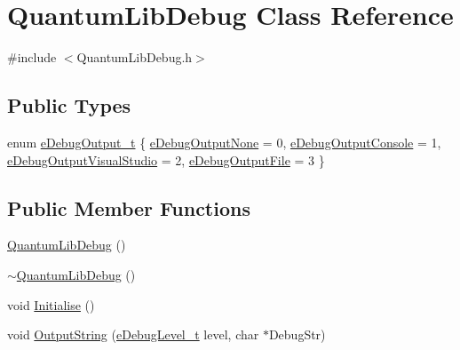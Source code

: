 \hypertarget{class_quantum_lib_debug}{}\section{Quantum\+Lib\+Debug Class Reference}
\label{class_quantum_lib_debug}


{\ttfamily \#include $<$Quantum\+Lib\+Debug.\+h$>$}

\subsection*{Public Types}
\begin{DoxyCompactItemize}
\item 
enum \mbox{\hyperlink{class_quantum_lib_debug_a02246b73828eeaee6859743af47523c7}{e\+Debug\+Output\+\_\+t}} \{ \mbox{\hyperlink{class_quantum_lib_debug_a02246b73828eeaee6859743af47523c7a9d690393603a0b15640bd9fd031d707c}{e\+Debug\+Output\+None}} = 0, 
\mbox{\hyperlink{class_quantum_lib_debug_a02246b73828eeaee6859743af47523c7ae2c700174e804a4cfd9c657ecac337c4}{e\+Debug\+Output\+Console}} = 1, 
\mbox{\hyperlink{class_quantum_lib_debug_a02246b73828eeaee6859743af47523c7ac72ddecd23f70d34ed2445e05b33006a}{e\+Debug\+Output\+Visual\+Studio}} = 2, 
\mbox{\hyperlink{class_quantum_lib_debug_a02246b73828eeaee6859743af47523c7ad2f92e5949ddf18ceba61b355859a64c}{e\+Debug\+Output\+File}} = 3
 \}
\end{DoxyCompactItemize}
\subsection*{Public Member Functions}
\begin{DoxyCompactItemize}
\item 
\mbox{\hyperlink{class_quantum_lib_debug_ae6b98a812d918c08cfc99a6113a3c9db}{Quantum\+Lib\+Debug}} ()
\item 
\mbox{\hyperlink{class_quantum_lib_debug_a176c88bb82e04d8ffe9a65ab56463fd1}{$\sim$\+Quantum\+Lib\+Debug}} ()
\item 
void \mbox{\hyperlink{class_quantum_lib_debug_aeb109d90f04802c183d0c41037094d17}{Initialise}} ()
\item 
void \mbox{\hyperlink{class_quantum_lib_debug_a3baba026471b16a53e182ac61d1daa27}{Output\+String}} (\mbox{\hyperlink{_quantum_lib_debug_8h_a2f13c7df267567b446dbccb2746149f3}{e\+Debug\+Level\+\_\+t}} level, char $\ast$Debug\+Str)
\end{DoxyCompactItemize}


